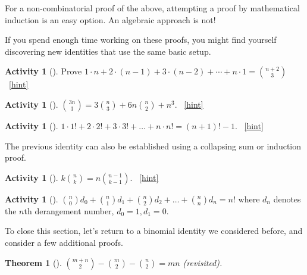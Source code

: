 \documentclass[10pt,]{book}
\theoremstyle{plain}
\newtheorem{theorem}{Theorem}[section]
\theoremstyle{definition}
\theoremstyle{definition}
\theoremstyle{definition}
\newtheorem{activity}[project]{Activity}
\numberwithin{equation}{chapter}
\begin{document}
\hypertarget{p-718}{}%
For a non-combinatorial proof of the above, attempting a proof by mathematical induction is an easy option. An algebraic approach is not!%
\par
\hypertarget{p-719}{}%
If you spend enough time working on these proofs, you might find yourself discovering new identities that use the same basic setup.%
\begin{activity}[]\label{activity-96}
\hypertarget{p-720}{}%
Prove \(1\cdot n + 2 \cdot (n-1) + 3 \cdot (n-2) + \cdots + n \cdot 1 = \binom{n+2}{3}\)%
~\hfill{\tiny\hyperlink{a-103}{[hint]}\hypertarget{q-103}{}}\end{activity}
\begin{activity}[]\label{activity-97}
\hypertarget{p-724}{}%
\(\binom{3n}{3} = 3 \binom{n}{3} + 6n \binom{n}{2} + n^{3}\).%
~\hfill{\tiny\hyperlink{a-104}{[hint]}\hypertarget{q-104}{}}\end{activity}
\begin{activity}[]\label{activity-98}
\hypertarget{p-727}{}%
\(1 \cdot 1! + 2 \cdot 2! + 3 \cdot 3! + \ldots + n \cdot n! = \left( n + 1 \right)! - 1\).%
~\hfill{\tiny\hyperlink{a-105}{[hint]}\hypertarget{q-105}{}}\end{activity}
\hypertarget{p-730}{}%
The previous identity can also be established using a collapsing sum or induction proof.%
\begin{activity}[]\label{activity-99}
\hypertarget{p-731}{}%
\(k \binom{n}{k} = n \binom{n - 1}{k - 1}\).%
~\hfill{\tiny\hyperlink{a-106}{[hint]}\hypertarget{q-106}{}}\end{activity}
\begin{activity}[]\label{activity-100}
\hypertarget{p-735}{}%
\(\binom{n}{0} d_{0} + \binom{n}{1} d_{1} + \binom{n}{2} d_{2} + \ldots + \binom{n}{n} d_{n} = n!\) where \(d_{n}\) denotes the \(n\)th derangement number, \(d_{0} = 1,d_{1} = 0\).%
\end{activity}
\hypertarget{p-737}{}%
To close this section, let's return to a binomial identity we considered before, and consider a few additional proofs.%
\begin{theorem}[{}]\label{theorem-11}
\hypertarget{p-738}{}%
\(\binom{m + n}{2} - \binom{m}{2} - \binom{n}{2} = mn\) (revisited).%
\end{theorem}
\end{document}
